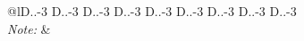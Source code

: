 \begin{table}[!htbp]
\begin{tabular}{@{\extracolsep{5pt}}lD{.}{.}{-3} D{.}{.}{-3} D{.}{.}{-3} D{.}{.}{-3} D{.}{.}{-3} D{.}{.}{-3} D{.}{.}{-3} D{.}{.}{-3} D{.}{.}{-3} }
\hline 
\hline \\[-1.8ex] 
\textit{Note:}  &  \\ 
\end{tabular} 
\end{table} 
